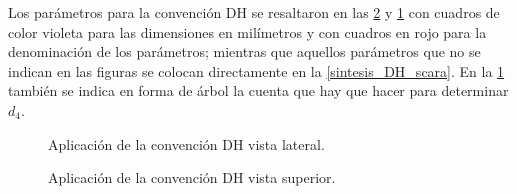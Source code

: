 \documentclass[a4paper,12pt]{article}
\begin{document}
Los parámetros para la convención DH se resaltaron en las \cref{DH_superior} y \cref{DH_lateral}
con cuadros de color violeta para las dimensiones en milímetros y con cuadros en rojo
para la denominación de los parámetros; mientras que aquellos parámetros que no se indican en las figuras
se colocan directamente en la \cref{sintesis_DH_scara}. En la \cref{DH_lateral} también se indica en forma
de árbol la cuenta que hay que hacer para determinar $d_4$.

\begin{figure}[H]
    \centering
    \begin{adjustbox}{scale = 0.66, max width=\columnwidth}
    \end{adjustbox}
    \caption{Aplicación de la convención DH vista lateral.}
    \label{DH_lateral}
\end{figure}

\begin{figure}[H]
    \centering
    \begin{adjustbox}{scale = 0.6, max width=\columnwidth}
    \end{adjustbox}
    \caption{Aplicación de la convención DH vista superior.}
    \label{DH_superior}
\end{figure}
\end{document}
